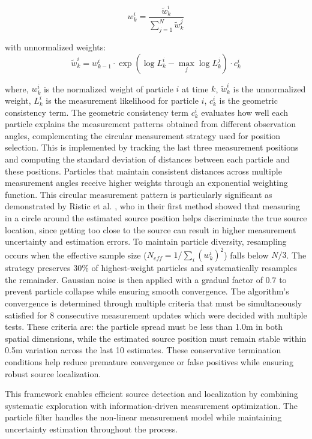 \documentclass[../report.tex]{subfiles}
\begin{document}
    \begin{equation}
    w_k^i = \frac{\tilde{w}_k^i}{\sum_{j=1}^N \tilde{w}_k^j}
    \end{equation}

    with unnormalized weights:
    \begin{equation}
    \tilde{w}_k^i = w_{k-1}^i \cdot \exp(\log L_k^i - \max_j \log L_k^j) \cdot c_k^i
    \end{equation}

    where, $w_k^i$ is the normalized weight of particle $i$ at time $k$, $\tilde{w}_k^i$ is the unnormalized weight, $L_k^i$ is the measurement likelihood for particle $i$, $c_k^i$ is the geometric 
    consistency term. The geometric consistency term $c_k^i$ evaluates how well each particle explains the measurement patterns obtained from different observation angles, complementing the circular 
    measurement strategy used for position selection. This is implemented by tracking the last three measurement positions and computing the standard deviation of distances between each particle and 
    these positions. Particles that maintain consistent distances across multiple measurement angles receive higher weights through an exponential weighting function. This circular measurement pattern 
    is particularly significant as demonstrated by Ristic et al. \cite{Ristic2007AnIG}, who in their first method showed that measuring in a circle around the estimated source position helps 
    discriminate the true source location, since getting too close to the source can result in higher measurement uncertainty and estimation errors. To maintain particle diversity, resampling occurs when the effective sample size ($N_{eff} = 1/\sum_i(w_k^i)^2$) falls below $N/3$. The strategy preserves $30\%$ of highest-weight
    particles and systematically resamples the remainder. Gaussian noise is then applied with a gradual factor of $0.7$ to prevent particle collapse while ensuring 
    smooth convergence. The algorithm's convergence is determined through multiple criteria that must be simultaneously satisfied for 8 consecutive measurement updates which were decided with
    multiple tests. These criteria are: the particle spread must be less than 1.0m in both spatial dimensions, while the estimated source position must remain stable within 0.5m variation across 
    the last 10 estimates. These conservative termination conditions help reduce premature convergence or false positives while ensuring robust source localization.


    This framework enables efficient source detection and localization by combining systematic exploration with information-driven measurement optimization. The particle filter handles the 
    non-linear measurement model while maintaining uncertainty estimation throughout the process.
\end{document}
